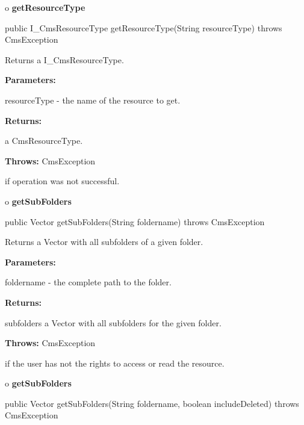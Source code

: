 o {\bf getResourceType}

\begin{PRE}
 public I\_CmsResourceType getResourceType(String resourceType) throws CmsException
\end{PRE}

\begin{description}
\htmlDD Returns a I\_CmsResourceType.

\begin{description}
\item {\bf Parameters:}

resourceType - the name of the resource to get.
\item {\bf Returns:}

a CmsResourceType.
\item {\bf Throws:} CmsException

if operation was not successful.
\end{description}

\end{description}

o {\bf getSubFolders}

\begin{PRE}
 public Vector getSubFolders(String foldername) throws CmsException
\end{PRE}

\begin{description}
\htmlDD Returns a Vector with all subfolders of a given folder.

\begin{description}
\item {\bf Parameters:}

foldername - the complete path to the folder.
\item {\bf Returns:}

subfolders a Vector with all subfolders for the given folder.
\item {\bf Throws:} CmsException

if the user has not the rights to access or read the resource.
\end{description}

\end{description}

o {\bf getSubFolders}

\begin{PRE}
 public Vector getSubFolders(String foldername,
                             boolean includeDeleted) throws CmsException
\end{PRE}

